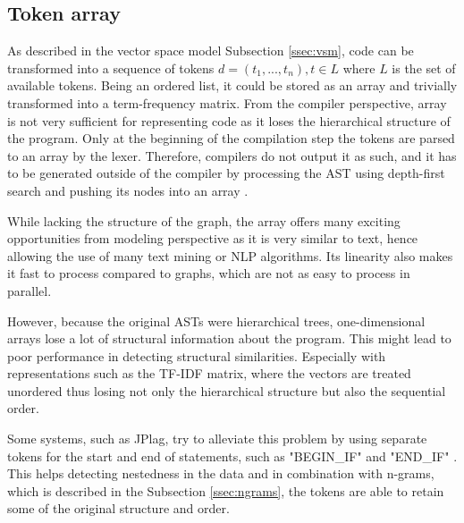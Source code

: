 \subsection{Token array}
\label{ssec:array}

As described in the vector space model Subsection \ref{ssec:vsm}, code can be transformed into a sequence of tokens $d=(t_1, ..., t_n), t\in L$ where $L$ is the set of available tokens. Being an ordered list, it could be stored as an array and trivially transformed into a term-frequency matrix. From the compiler perspective, array is not very sufficient for representing code as it loses the hierarchical structure of the program. Only at the beginning of the compilation step the tokens are parsed to an array by the lexer. Therefore, compilers do not output it as such, and it has to be generated outside of the compiler by processing the AST using depth-first search and pushing its nodes into an array \cite{engineering-compiler, aho2007compilers}.

While lacking the structure of the graph, the array offers many exciting opportunities from modeling perspective as it is very similar to text, hence allowing the use of many text mining or NLP algorithms. Its linearity also makes it fast to process compared to graphs, which are not as easy to process in parallel\cite{parallel-graphs-2018}.

However, because the original ASTs were hierarchical trees, one-dimensional arrays lose a lot of structural information about the program. This might lead to poor performance in detecting structural similarities. Especially with representations such as the TF-IDF matrix, where the vectors are treated unordered thus losing not only the hierarchical structure but also the sequential order.

Some systems, such as JPlag, try to alleviate this problem by using separate tokens for the start and end of statements, such as "BEGIN\_IF" and "END\_IF" \cite{jplag}. This helps detecting nestedness in the data and in combination with n-grams, which is described in the Subsection \ref{ssec:ngrams}, the tokens are able to retain some of the original structure and order.
